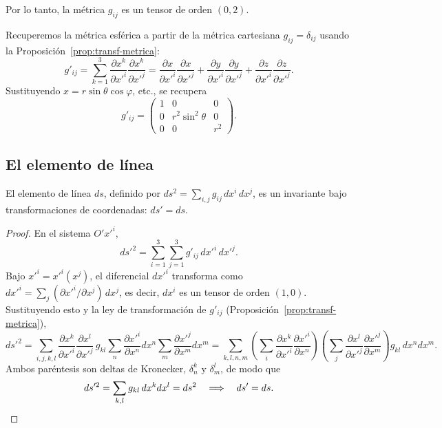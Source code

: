 Por lo tanto, la métrica $g_{ij}$ es un tensor de orden $(0,2)$.

\begin{ejemplo}
Recuperemos la métrica esférica a partir de la métrica cartesiana
$g_{ij}=\delta_{ij}$ usando la Proposición~\ref{prop:transf-metrica}:
\[
g'_{ij} = \sum_{k=1}^3 \frac{\partial x^k}{\partial x'^i}\frac{\partial
x^k}{\partial x'^j} = \frac{\partial x}{\partial x'^i}\frac{\partial
x}{\partial x'^j} + \frac{\partial y}{\partial x'^i}\frac{\partial
y}{\partial x'^j} + \frac{\partial z}{\partial x'^i}\frac{\partial
z}{\partial x'^j} .
\]
Sustituyendo $x=r\sin\theta\cos\varphi$, etc., se recupera
\[
g'_{ij} = \begin{pmatrix} 1 & 0 & 0 \\ 0 & r^2\sin^2\theta & 0 \\ 0 & 0 &
r^2 \end{pmatrix}.
\]
\end{ejemplo}

\subsection{El elemento de línea}

\begin{proposicionc}
El elemento de línea $ds$, definido por $ds^2 = \sum_{i,j} g_{ij}\,
dx^i\,dx^j$, es un invariante bajo transformaciones de coordenadas:
$ds' = ds$.
\end{proposicionc}

\begin{proof}
En el sistema $O'x'^i$,
\[
ds'^2 = \sum_{i=1}^3\sum_{j=1}^3 g'_{ij}\, dx'^i\, dx'^j .
\]
Bajo $x'^i=x'^i(x^j)$, el diferencial $dx'^i$ transforma como
$dx'^i = \sum_j (\partial x'^i/\partial x^j)\, dx^j$, es decir, $dx^i$ es
un tensor de orden $(1,0)$. Sustituyendo esto y la ley de transformación
de $g'_{ij}$ (Proposición~\ref{prop:transf-metrica}),
\[
ds'^2 = \sum_{i,j,k,l} \frac{\partial x^k}{\partial x'^i}\frac{\partial
x^l}{\partial x'^j}\, g_{kl} \sum_{n} \frac{\partial x'^i}{\partial x^n}
dx^n \sum_{m}\frac{\partial x'^j}{\partial x^m} dx^m
= \sum_{k,l,n,m} \left(\sum_i \frac{\partial x^k}{\partial x'^i}
\frac{\partial x'^i}{\partial x^n}\right)\!\!\left(\sum_j \frac{\partial
x^l}{\partial x'^j}\frac{\partial x'^j}{\partial x^m}\right) g_{kl}\,
dx^n dx^m .
\]
Ambos paréntesis son deltas de Kronecker, $\delta^k_n$ y $\delta^l_m$, de
modo que
\[
ds'^2 = \sum_{k,l} g_{kl}\, dx^k dx^l = ds^2 \quad\Longrightarrow\quad
ds' = ds . \qedhere
\]
\end{proof}

